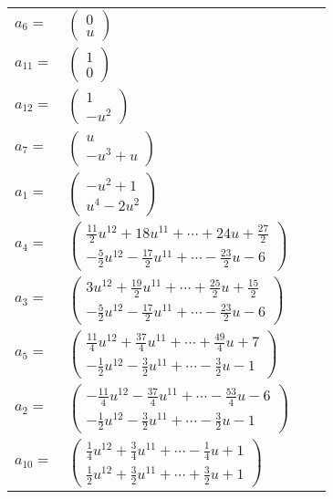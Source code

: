 \documentclass[1p]{elsarticle_modified}
\theoremstyle{definition}
\begin{document}
\begin{tabular}{m{7pt} m{180pt} m{7pt} m{180pt} }
\flushright $a_{6}=$&$\begin{pmatrix}0\\u\end{pmatrix}$ \\
\flushright $a_{11}=$&$\begin{pmatrix}1\\0\end{pmatrix}$ \\
\flushright $a_{12}=$&$\begin{pmatrix}1\\- u^2\end{pmatrix}$ \\
\flushright $a_{7}=$&$\begin{pmatrix}u\\- u^3+u\end{pmatrix}$ \\
\flushright $a_{1}=$&$\begin{pmatrix}- u^2+1\\u^4-2 u^2\end{pmatrix}$ \\
\flushright $a_{4}=$&$\begin{pmatrix}\frac{11}{2} u^{12}+18 u^{11}+\cdots+24 u+\frac{27}{2}\\-\frac{5}{2} u^{12}-\frac{17}{2} u^{11}+\cdots-\frac{23}{2} u-6\end{pmatrix}$ \\
\flushright $a_{3}=$&$\begin{pmatrix}3 u^{12}+\frac{19}{2} u^{11}+\cdots+\frac{25}{2} u+\frac{15}{2}\\-\frac{5}{2} u^{12}-\frac{17}{2} u^{11}+\cdots-\frac{23}{2} u-6\end{pmatrix}$ \\
\flushright $a_{5}=$&$\begin{pmatrix}\frac{11}{4} u^{12}+\frac{37}{4} u^{11}+\cdots+\frac{49}{4} u+7\\-\frac{1}{2} u^{12}-\frac{3}{2} u^{11}+\cdots-\frac{3}{2} u-1\end{pmatrix}$ \\
\flushright $a_{2}=$&$\begin{pmatrix}-\frac{11}{4} u^{12}-\frac{37}{4} u^{11}+\cdots-\frac{53}{4} u-6\\-\frac{1}{2} u^{12}-\frac{3}{2} u^{11}+\cdots-\frac{3}{2} u-1\end{pmatrix}$ \\
\flushright $a_{10}=$&$\begin{pmatrix}\frac{1}{4} u^{12}+\frac{3}{4} u^{11}+\cdots-\frac{1}{4} u+1\\\frac{1}{2} u^{12}+\frac{3}{2} u^{11}+\cdots+\frac{3}{2} u+1\end{pmatrix}$ \\

\end{tabular}
\end{document}
